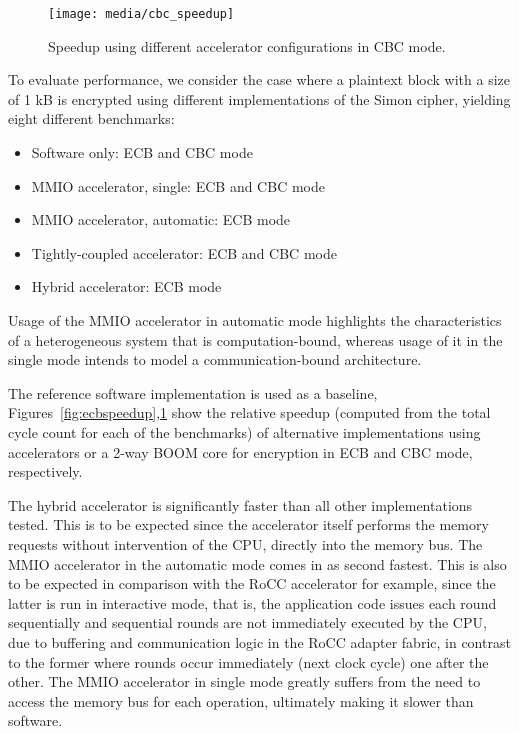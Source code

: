 \documentclass[10pt,conference]{IEEEtran}
\begin{document}
\begin{figure}
  \centering
  \texttt{[image: media/cbc\_speedup]}
  \caption{Speedup using different accelerator configurations in CBC mode.}
  \label{fig:cbcspeedup}
\end{figure}

To evaluate performance, we consider the case where a plaintext block with a size of
1 kB is encrypted using different implementations of the Simon cipher, yielding
eight different benchmarks:

\begin{itemize}
\item Software only: ECB and CBC mode
\item MMIO accelerator, single: ECB and CBC mode
\item MMIO accelerator, automatic: ECB mode
\item Tightly-coupled accelerator: ECB and CBC mode
\item Hybrid accelerator: ECB mode
\end{itemize}

Usage of the MMIO accelerator in automatic mode highlights the characteristics
of a heterogeneous system that is computation-bound, whereas usage of it in the
single mode intends to model a communication-bound architecture.

The reference software implementation is used as a baseline,
Figures~\ref{fig:ecbspeedup},\ref{fig:cbcspeedup} show the relative speedup
(computed from the total cycle count for each of the benchmarks) of alternative
implementations using accelerators or a 2-way BOOM core for encryption in ECB
and CBC mode, respectively.

The hybrid accelerator is significantly faster than all other implementations
tested. This is to be expected since the accelerator itself performs the memory
requests without intervention of the CPU, directly into the memory bus. The
MMIO accelerator in the automatic mode comes in as second fastest. This
is also to be expected in comparison with the RoCC accelerator for example,
since the latter is run in interactive mode, that is, the application code
issues each round sequentially and sequential rounds are not immediately
executed by the CPU, due to buffering and communication logic in the RoCC
adapter fabric, in contrast to the former where rounds occur immediately (next
clock cycle) one after the other. The MMIO accelerator in single mode greatly
suffers from the need to access the memory bus for each operation, ultimately
making it slower than software.
\end{document}
